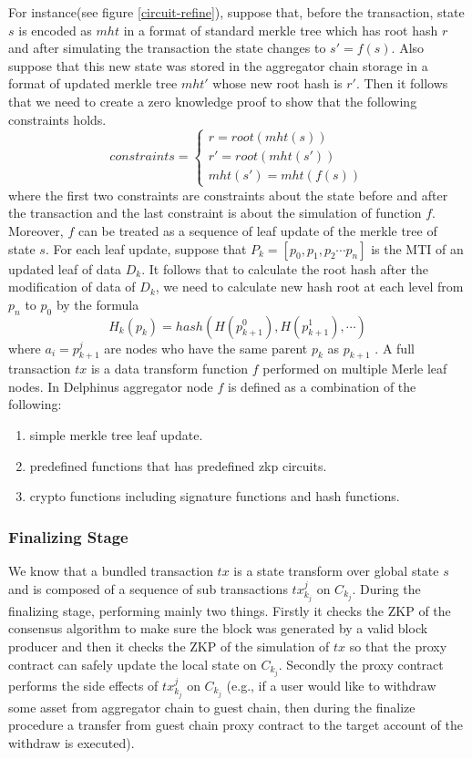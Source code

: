 \documentclass[pageno]{jpaper}
\begin{document}
For instance(see figure \ref{circuit-refine}), suppose that, before the transaction, state $s$ is encoded as $mht$ in a format of standard merkle tree which has root hash $r$ and after simulating the transaction the state changes to $s' = f(s)$. Also suppose that this new state was stored in the aggregator chain storage in a format of updated merkle tree $mht'$ whose new root hash is $r'$.
Then it follows that we need to create a zero knowledge proof to show that the following constraints holds.
\[ constraints = \begin{cases}
    r = root(mht(s)) \\
    r' = root(mht(s'))\\
    mht(s') = mht(f(s))
\end{cases} \]
where the first two constraints are constraints about the state before and after the transaction and the last constraint is about the simulation of function $f$.\\
\newline
Moreover, $f$ can be treated as a sequence of leaf update of the merkle tree of state $s$. For each leaf update, suppose that $P_k = [p_0, p_1, p_2 \cdots p_n]$ is the MTI of an updated leaf of data $D_k$. It follows that to calculate the root hash after the modification of data of $D_k$, we need to calculate new hash root at each level from $p_n$ to $p_0$ by the formula
$$
    H_k(p_k) = hash(H(p_{k+1}^0), H(p_{k+1}^1),\cdots) 
$$
where $a_i = p_{k+1}^{j}$ are nodes who have the same parent $p_k$ as $p_{k+1}$ \cite{liskov2005updatable}. A full transaction $tx$ is a data transform function $f$ performed on multiple Merle leaf nodes. In Delphinus aggregator node $f$ is defined as a combination of the following:

\begin{enumerate}[leftmargin=*]
\item simple merkle tree leaf update.
\item predefined functions that has predefined zkp circuits.
\item crypto functions including signature functions and hash functions.
\end{enumerate}

\subsubsection{Finalizing Stage}
We know that a bundled transaction $tx$ is a state transform over global state $s$ and is composed of a sequence of sub transactions $tx^j_{k_j}$ on $C_{k_j}$. During the finalizing stage, \dprotocol performing mainly two things. Firstly it checks the ZKP of the consensus algorithm to make sure the block was generated by a valid block producer and then it checks the ZKP of the simulation of $tx$ so that the proxy contract can safely update the local state on $C_{k_j}$. Secondly the proxy contract performs the side effects of $tx^j_{k_j}$ on $C_{k_j}$ (e.g., if a user would like to withdraw some asset from aggregator chain to guest chain, then during the finalize procedure a transfer from guest chain proxy contract to the target account of the withdraw is executed).
\end{document}

